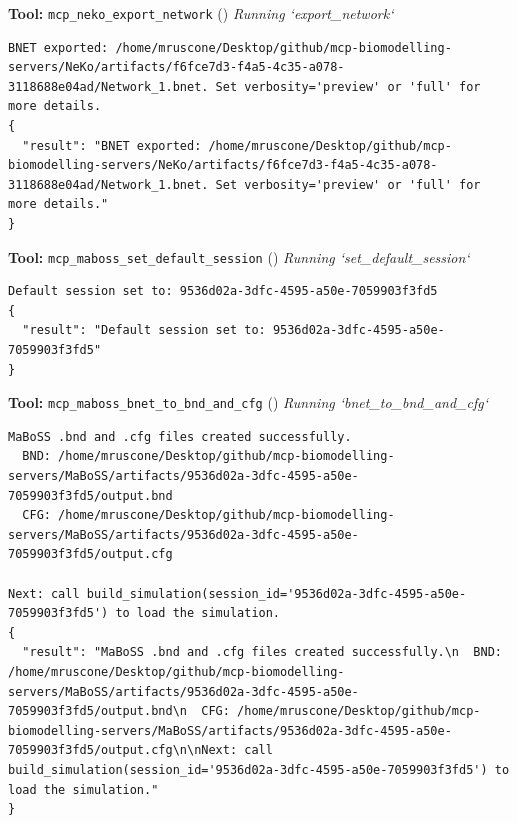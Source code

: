 \documentclass[11pt,a4paper]{article}
\begin{document}
\begin{toolokbox}
\textbf{Tool:} \texttt{mcp\_neko\_export\_network} (\checkmark)
\textit{Running `export\_network`}
\begin{lstlisting}
BNET exported: /home/mruscone/Desktop/github/mcp-biomodelling-servers/NeKo/artifacts/f6fce7d3-f4a5-4c35-a078-3118688e04ad/Network_1.bnet. Set verbosity='preview' or 'full' for more details.
{
  "result": "BNET exported: /home/mruscone/Desktop/github/mcp-biomodelling-servers/NeKo/artifacts/f6fce7d3-f4a5-4c35-a078-3118688e04ad/Network_1.bnet. Set verbosity='preview' or 'full' for more details."
}
\end{lstlisting}
\end{toolokbox}
\begin{toolokbox}
\textbf{Tool:} \texttt{mcp\_maboss\_set\_default\_session} (\checkmark)
\textit{Running `set\_default\_session`}
\begin{lstlisting}
Default session set to: 9536d02a-3dfc-4595-a50e-7059903f3fd5
{
  "result": "Default session set to: 9536d02a-3dfc-4595-a50e-7059903f3fd5"
}
\end{lstlisting}
\end{toolokbox}
\begin{toolokbox}
\textbf{Tool:} \texttt{mcp\_maboss\_bnet\_to\_bnd\_and\_cfg} (\checkmark)
\textit{Running `bnet\_to\_bnd\_and\_cfg`}
\begin{lstlisting}
MaBoSS .bnd and .cfg files created successfully.
  BND: /home/mruscone/Desktop/github/mcp-biomodelling-servers/MaBoSS/artifacts/9536d02a-3dfc-4595-a50e-7059903f3fd5/output.bnd
  CFG: /home/mruscone/Desktop/github/mcp-biomodelling-servers/MaBoSS/artifacts/9536d02a-3dfc-4595-a50e-7059903f3fd5/output.cfg

Next: call build_simulation(session_id='9536d02a-3dfc-4595-a50e-7059903f3fd5') to load the simulation.
{
  "result": "MaBoSS .bnd and .cfg files created successfully.\n  BND: /home/mruscone/Desktop/github/mcp-biomodelling-servers/MaBoSS/artifacts/9536d02a-3dfc-4595-a50e-7059903f3fd5/output.bnd\n  CFG: /home/mruscone/Desktop/github/mcp-biomodelling-servers/MaBoSS/artifacts/9536d02a-3dfc-4595-a50e-7059903f3fd5/output.cfg\n\nNext: call build_simulation(session_id='9536d02a-3dfc-4595-a50e-7059903f3fd5') to load the simulation."
}
\end{lstlisting}
\end{toolokbox}
\end{document}

